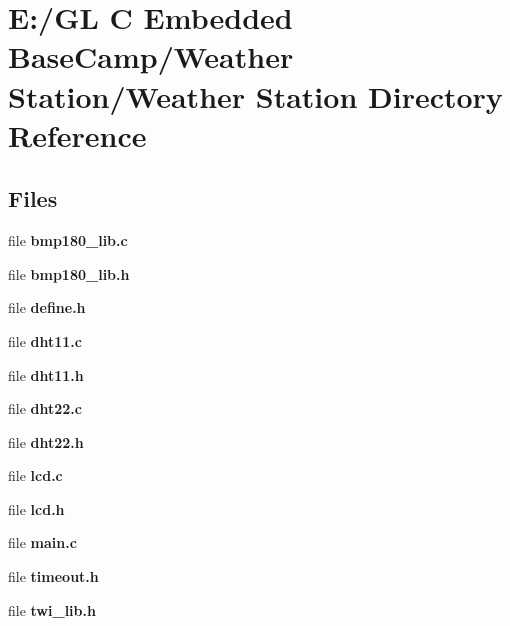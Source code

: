 \section{E\+:/\+GL C Embedded Base\+Camp/\+Weather Station/\+Weather Station Directory Reference}
\label{dir_8ccd5a460b12e8800ac13da08b7af6a8}
\subsection*{Files}
\begin{DoxyCompactItemize}
\item 
file \textbf{ bmp180\+\_\+lib.\+c}
\item 
file \textbf{ bmp180\+\_\+lib.\+h}
\item 
file \textbf{ define.\+h}
\item 
file \textbf{ dht11.\+c}
\item 
file \textbf{ dht11.\+h}
\item 
file \textbf{ dht22.\+c}
\item 
file \textbf{ dht22.\+h}
\item 
file \textbf{ lcd.\+c}
\item 
file \textbf{ lcd.\+h}
\item 
file \textbf{ main.\+c}
\item 
file \textbf{ timeout.\+h}
\item 
file \textbf{ twi\+\_\+lib.\+h}
\end{DoxyCompactItemize}
